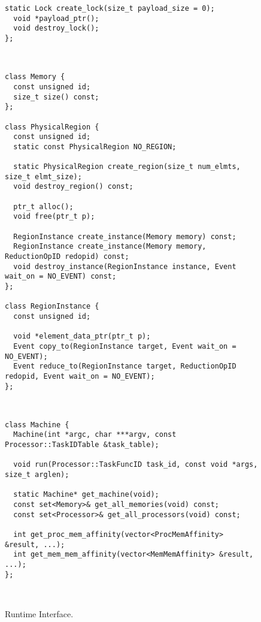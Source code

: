 \begin{figure}
\begin{lrbox}{\mylistingbox}
\begin{lstlisting}[firstnumber=30]
  static Lock create_lock(size_t payload_size = 0);
  void *payload_ptr();
  void destroy_lock();
};
\end{lstlisting}
\end{lrbox}
\subfigure{\usebox{\mylistingbox}} \\
\vspace{-0.2cm}

\begin{lrbox}{\mylistingbox}
\begin{lstlisting}[firstnumber=39]
class Memory {
  const unsigned id;
  size_t size() const;
};

class PhysicalRegion {
  const unsigned id;
  static const PhysicalRegion NO_REGION;

  static PhysicalRegion create_region(size_t num_elmts, size_t elmt_size);
  void destroy_region() const;

  ptr_t alloc();
  void free(ptr_t p);

  RegionInstance create_instance(Memory memory) const;
  RegionInstance create_instance(Memory memory, ReductionOpID redopid) const;
  void destroy_instance(RegionInstance instance, Event wait_on = NO_EVENT) const;
};

class RegionInstance {
  const unsigned id;

  void *element_data_ptr(ptr_t p);
  Event copy_to(RegionInstance target, Event wait_on = NO_EVENT);
  Event reduce_to(RegionInstance target, ReductionOpID redopid, Event wait_on = NO_EVENT);
};
\end{lstlisting}
\end{lrbox}
\subfigure{\usebox{\mylistingbox}} \\
\vspace{-0.2cm}

\begin{lrbox}{\mylistingbox}
\begin{lstlisting}[firstnumber=last]
class Machine {
  Machine(int *argc, char ***argv, const Processor::TaskIDTable &task_table);

  void run(Processor::TaskFuncID task_id, const void *args, size_t arglen);

  static Machine* get_machine(void);
  const set<Memory>& get_all_memories(void) const;
  const set<Processor>& get_all_processors(void) const;

  int get_proc_mem_affinity(vector<ProcMemAffinity> &result, ...);
  int get_mem_mem_affinity(vector<MemMemAffinity> &result, ...);
};
\end{lstlisting}
\end{lrbox}
\subfigure{\usebox{\mylistingbox}} \\

\caption{Runtime Interface.\label{fig:runtimeapi}}
\vspace{-4mm}
\end{figure}

